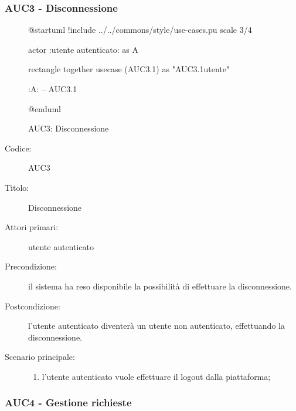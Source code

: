 \documentclass[casi-duso]{subfiles}
\begin{document}
\subsubsection{AUC3 - Disconnessione}%
\label{subsub:AUC3}

\begin{figure}[h!] 
  \centering 
  \begin{plantuml}
  @startuml
  !include ../../commons/style/use-cases.pu
  scale 3/4

  actor :utente autenticato: as A

  rectangle {
    together {
      usecase (AUC3.1) as "AUC3.1\nDisconnessione utente"
    }
  }

  :A: -- AUC3.1

  @enduml
  \end{plantuml} 
  \caption{AUC3: Disconnessione} 
  \label{fig:auc3} 
\end{figure}

\begin{description}
  \item[Codice:] AUC3
  \item[Titolo:] Disconnessione
  \item[Attori primari:] utente autenticato
  \item[Precondizione:] il sistema ha reso disponibile la possibilità di effettuare la disconnessione.
  \item[Postcondizione:] l'utente autenticato diventerà un utente non autenticato, effettuando la disconnessione.
  \item[Scenario principale:] 
  \begin{enumerate}
    \item l'utente autenticato vuole effettuare il logout dalla piattaforma;
  \end{enumerate}
\end{description}

\subsubsection{AUC4 - Gestione richieste}%
\label{subsub:AUC4}
\end{document}
